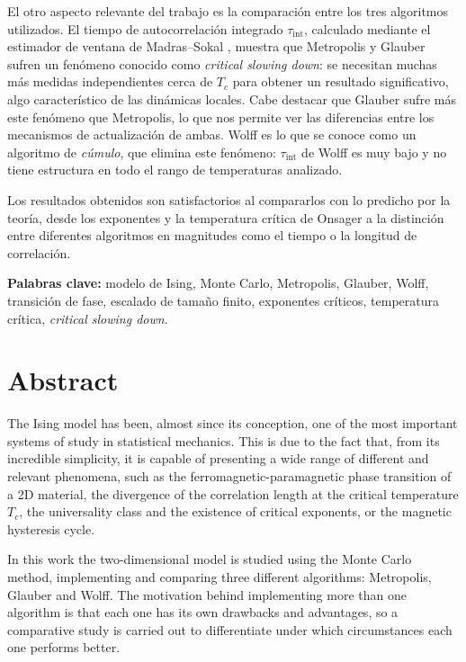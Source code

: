 El otro aspecto relevante del trabajo es la comparación entre los tres algoritmos utilizados. El tiempo de autocorrelación integrado $\tau_{\text{int}}$, calculado mediante el estimador de ventana de Madras--Sokal \citep{Madras1988}, muestra que Metropolis y Glauber sufren un fenómeno conocido como \textit{critical slowing down}: se necesitan muchas más medidas independientes cerca de $T_c$ para obtener un resultado significativo, algo característico de las dinámicas locales. Cabe destacar que Glauber sufre más este fenómeno que Metropolis, lo que nos permite ver las diferencias entre los mecanismos de actualización de ambas. Wolff es lo que se conoce como un algoritmo de \textit{cúmulo}, que elimina este fenómeno: $\tau_{\text{int}}$ de Wolff es muy bajo y no tiene estructura en todo el rango de temperaturas analizado.

Los resultados obtenidos son satisfactorios al compararlos con lo predicho por la teoría, desde los exponentes y la temperatura crítica de Onsager a la distinción entre diferentes algoritmos en magnitudes como el tiempo o la longitud de correlación.
\enlargethispage{\baselineskip}

\textbf{Palabras clave:} modelo de Ising, Monte Carlo, Metropolis, Glauber, Wolff, transición de fase, escalado de tamaño finito, exponentes críticos, temperatura crítica, \textit{critical slowing down}.

\section*{Abstract}
The Ising model has been, almost since its conception, one of the most important systems of study in statistical mechanics. This is due to the fact that, from its incredible simplicity, it is capable of presenting a wide range of different and relevant phenomena, such as the ferromagnetic-paramagnetic phase transition of a 2D material, the divergence of the correlation length at the critical temperature $T_c$, the universality class and the existence of critical exponents, or the magnetic hysteresis cycle.

In this work the two-dimensional model is studied using the Monte Carlo method, implementing and comparing three different algorithms: Metropolis, Glauber and Wolff. The motivation behind implementing more than one algorithm is that each one has its own drawbacks and advantages, so a comparative study is carried out to differentiate under which circumstances each one performs better.

